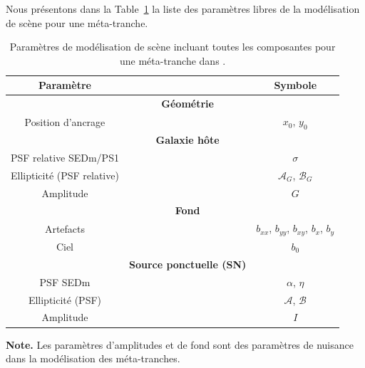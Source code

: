 \documentclass[../main/main.tex]{subfiles}
\begin{document}
Nous présentons dans la Table~\ref{tab:paramshypergal} la liste des
paramètres libres de la modélisation de scène pour une méta-tranche.
\begin{table}
  \scriptsize
  \centerfloat
  \setlength\tabcolsep{14pt}
  \renewcommand{\arraystretch}{1.5}
  \begin{threeparttable}
    \caption[Paramètres de modélisation de scène 2D avec \hypergal.]{Paramètres de modélisation de scène incluant toutes les
      composantes pour une méta-tranche dans \hypergal.}
    \label{tab:paramshypergal}
    \begin{tabular}{ccc}
      \toprule                               
      \textbf{Paramètre} &  & \textbf{Symbole} \\            
      \midrule
                         &\textbf{Géométrie}& \\
      \hline 
      Position d'ancrage  & & $x_{0}$, $y_{0}$\\
      
      \hline
      
                         &\textbf{Galaxie hôte}& \\
      
      \hline
      PSF relative SEDm/PS1 &  & $\sigma$ \\
      Ellipticité (PSF relative) &  & $\mathcal{A}_{G}$, $\mathcal{B}_{G}$\\
      Amplitude & & $G$\\
      
      \hline                               

                         &\textbf{Fond}& \\
      \hline
      
      Artefacts& & $b_{xx}$, $b_{yy}$, $b_{xy}$, $b_{x}$, $b_{y}$\\
      Ciel & & $b_{0}$\\
      
      \hline
                         &\textbf{Source ponctuelle (SN)}&\\
      
      \hline
      PSF SEDm  & & $\alpha$, $\eta$\\
      
      Ellipticité (PSF) &  & $\mathcal{A}$, $\mathcal{B}$\\
      Amplitude & & $I$ \\
      
      \bottomrule
    \end{tabular}
    \begin{tablenotes}[flushleft]
    \item \textbf{Note.} Les paramètres d'amplitudes et de fond sont
      des paramètres de nuisance dans la modélisation des méta-tranches. 
    \end{tablenotes}
  \end{threeparttable}
\end{table}
\end{document}
